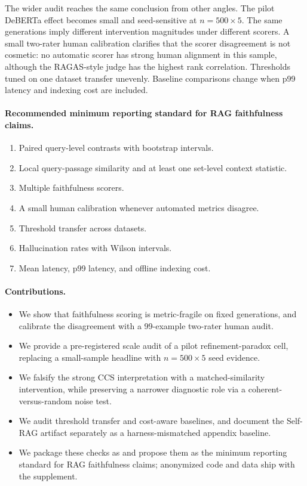 The wider audit reaches the same conclusion from other angles. The pilot
DeBERTa effect becomes small and seed-sensitive at \(n=500\times5\). The same
generations imply different intervention magnitudes under different scorers.
A small two-rater human calibration clarifies that the scorer disagreement is
not cosmetic: no automatic scorer has strong human alignment in this sample,
although the RAGAS-style judge has the highest rank correlation. Thresholds
tuned on one dataset transfer unevenly. Baseline comparisons change when p99
latency and indexing cost are included.

\paragraph{Recommended minimum reporting standard for RAG faithfulness claims.}
\begin{enumerate}[leftmargin=1.8em,itemsep=1pt,topsep=2pt]
  \item Paired query-level contrasts with bootstrap intervals.
  \item Local query-passage similarity and at least one set-level context statistic.
  \item Multiple faithfulness scorers.
  \item A small human calibration whenever automated metrics disagree.
  \item Threshold transfer across datasets.
  \item Hallucination rates with Wilson intervals.
  \item Mean latency, p99 latency, and offline indexing cost.
\end{enumerate}

\paragraph{Contributions.}
\begin{itemize}[leftmargin=1.6em,itemsep=2pt,topsep=2pt]
  \item We show that faithfulness scoring is metric-fragile on fixed
  generations, and calibrate the disagreement with a 99-example two-rater
  human audit.
  \item We provide a pre-registered scale audit of a pilot refinement-paradox
  cell, replacing a small-sample headline with \(n=500\times5\) seed evidence.
  \item We falsify the strong CCS interpretation with a matched-similarity
  intervention, while preserving a narrower diagnostic role via a
  coherent-versus-random noise test.
  \item We audit threshold transfer and cost-aware baselines, and document the
  Self-RAG artifact separately as a harness-mismatched appendix baseline.
  \item We package these checks as \method{} and propose them as the minimum
  reporting standard for RAG faithfulness claims; anonymized code and data
  ship with the supplement.
\end{itemize}
